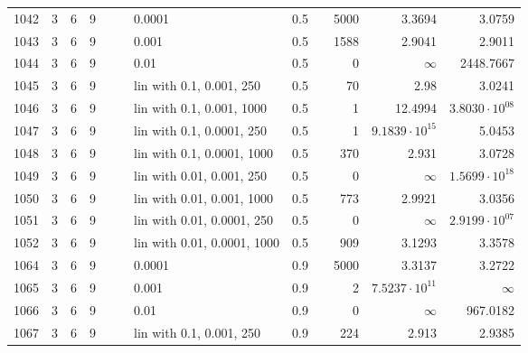 \begin{longtable}{lrrrrrlrrrrr}
1042 &       3 & 6 & 9 &   &   &                      0.0001 &  0.5 &        &    5000 &                 3.3694 &                 3.0759 \\
1043 &       3 & 6 & 9 &   &   &                       0.001 &  0.5 &        &    1588 &                 2.9041 &                 2.9011 \\
1044 &       3 & 6 & 9 &   &   &                        0.01 &  0.5 &        &       0 &               $\infty$ &              2448.7667 \\
1045 &       3 & 6 & 9 &   &   &    lin with 0.1, 0.001, 250 &  0.5 &        &      70 &                   2.98 &                 3.0241 \\
1046 &       3 & 6 & 9 &   &   &   lin with 0.1, 0.001, 1000 &  0.5 &        &       1 &                12.4994 &  $3.8030\cdot 10^{08}$ \\
1047 &       3 & 6 & 9 &   &   &   lin with 0.1, 0.0001, 250 &  0.5 &        &       1 &  $9.1839\cdot 10^{15}$ &                 5.0453 \\
1048 &       3 & 6 & 9 &   &   &  lin with 0.1, 0.0001, 1000 &  0.5 &        &     370 &                  2.931 &                 3.0728 \\
1049 &       3 & 6 & 9 &   &   &   lin with 0.01, 0.001, 250 &  0.5 &        &       0 &               $\infty$ &  $1.5699\cdot 10^{18}$ \\
1050 &       3 & 6 & 9 &   &   &  lin with 0.01, 0.001, 1000 &  0.5 &        &     773 &                 2.9921 &                 3.0356 \\
1051 &       3 & 6 & 9 &   &   &  lin with 0.01, 0.0001, 250 &  0.5 &        &       0 &               $\infty$ &  $2.9199\cdot 10^{07}$ \\
1052 &       3 & 6 & 9 &   &   & lin with 0.01, 0.0001, 1000 &  0.5 &        &     909 &                 3.1293 &                 3.3578 \\
1064 &       3 & 6 & 9 &   &   &                      0.0001 &  0.9 &        &    5000 &                 3.3137 &                 3.2722 \\
1065 &       3 & 6 & 9 &   &   &                       0.001 &  0.9 &        &       2 &  $7.5237\cdot 10^{11}$ &               $\infty$ \\
1066 &       3 & 6 & 9 &   &   &                        0.01 &  0.9 &        &       0 &               $\infty$ &               967.0182 \\
1067 &       3 & 6 & 9 &   &   &    lin with 0.1, 0.001, 250 &  0.9 &        &     224 &                  2.913 &                 2.9385 \\

\end{longtable}
